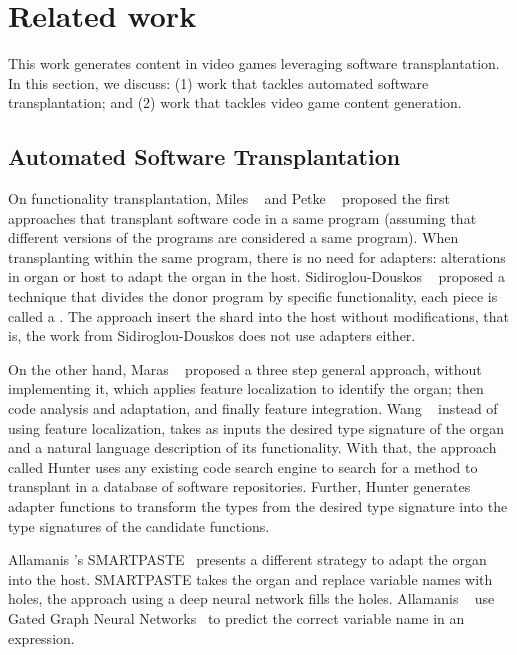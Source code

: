 \section{Related work} \label{sec:Related}

This work generates content in video games leveraging software transplantation. In this section, we discuss: (1) work that tackles automated software transplantation; and (2) work that tackles video game content generation.

\subsection{Automated Software Transplantation}

On functionality transplantation, Miles \etal~\cite{miles2012situ} and Petke \etal~\cite{petke2014using} proposed the first approaches that transplant software code in a same program (assuming that different versions of the programs are considered a same program). When transplanting within the same program, there is no need for adapters: alterations in organ or host to adapt the organ in the host. Sidiroglou-Douskos \etal~\cite{sidiroglou2015horizontal} proposed a technique that divides the donor program by specific functionality, each piece is called a . The approach insert the shard into the host without modifications, that is, the work from Sidiroglou-Douskos does not use adapters either.

On the other hand, Maras \etal~\cite{maras2015towards} proposed a three step general approach, without implementing it, which applies feature localization to identify the organ; then code analysis and adaptation, and finally feature integration. Wang \etal~\cite{wang2016hunter} instead of using feature localization, takes as inputs the desired type signature of the organ and a natural language description of its functionality. With that, the approach called Hunter uses any existing code search engine to search for a method to transplant in a database of software repositories. Further, Hunter generates adapter functions to transform the types from the desired type signature into the type signatures of the candidate functions.

Allamanis \etal's SMARTPASTE~\cite{allamanis2017smartpaste} presents a different strategy to adapt the organ into the host. SMARTPASTE takes the organ and replace variable names with holes, the approach using a deep neural network fills the holes. Allamanis \etal~\cite{allamanis2017smartpaste} use Gated Graph Neural Networks~\cite{li2015gated} to predict the correct variable name in an expression.

